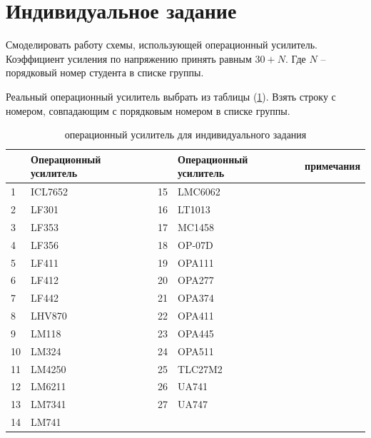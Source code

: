 
\vspace{-3cm}
\section{Индивидуальное задание}

Смоделировать работу схемы, использующей операционный усилитель. Коэффициент усиления по напряжению принять равным $30 + N$. Где $N$  -- порядковый номер студента в списке группы.

Реальный операционный усилитель выбрать из таблицы (\ref{opamp}). Взять строку с номером, совпадающим с порядковым номером в списке группы.

{\small
\begin{table}[!ht]
	\caption{операционный усилитель для индивидуального задания}
\begin{tabular}{ll|lll}
\toprule
	\No& Операционный усилитель&\No& Операционный усилитель& примечания\\
\midrule
1&ICL7652&15&LMC6062 &\\
2&LF301  &16&LT1013  &\\
3&LF353  &17&MC1458  &\\
4&LF356  &18&OP-07D  &\\
5&LF411  &19&OPA111  &\\
6&LF412  &20&OPA277  &\\
7&LF442  &21&OPA374  &\\
8&LHV870 &22&OPA411  &\\
9&LM118  &23&OPA445  &\\
10&LM324 &24&OPA511  &\\
11&LM4250&25&TLC27M2 &\\
12&LM6211&26&UA741   &\\
13&LM7341&27&UA747   &\\
14&LM741 &\\
\bottomrule
\end{tabular}
	\label{opamp}
\end{table}
}

